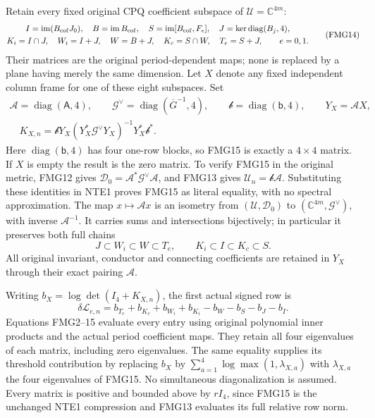 \documentclass[11pt,a4paper]{article}
\begin{document}
Retain every fixed original CPQ coefficient subspace of
$\mathcal U=\mathbb C^{4m}$:
\[
\begin{gathered}
 I=\operatorname{im}(B_{\rm cof}J_0),\quad
 B=\operatorname{im}B_{\rm cof},\quad
 S=\operatorname{im}[B_{\rm cof},F_e],\quad
 J=\ker\operatorname{diag}(B_j,4),\\
 K_i=I\cap J,\quad W_i=I+J,\quad W=B+J,\quad
 K_c=S\cap W,\quad T_e=S+J,\qquad e=0,1.
\end{gathered}                                                   \tag{FMG14}
\]
Their matrices are the original period-dependent maps; none is
replaced by a plane having merely the same dimension. Let $X$ denote
any fixed independent column frame for one of these eight subspaces.
Set
\[
\begin{gathered}
 \mathcal A=\operatorname{diag}(\mathsf A,4),\qquad
 \mathcal G^\vee=\operatorname{diag}(\overline G^{-1},4),\qquad
 \mathcal b=\operatorname{diag}(\mathsf b,4),\qquad Y_X=\mathcal A X,\\
 \boxed{\quad
 K_{X,n}=\mathcal bY_X(Y_X^*\mathcal G^\vee Y_X)^{-1}
                           Y_X^*\mathcal b^* .\quad}
\end{gathered}                                                   \tag{FMG15}
\]
Here $\operatorname{diag}(\mathsf b,4)$ has four one-row blocks,
so FMG15 is exactly a $4\times4$ matrix. If $X$ is empty the result
is the zero matrix. To verify FMG15 in the original metric, FMG12
gives $\mathcal D_0=\mathcal A^*\mathcal G^\vee\mathcal A$,
and FMG13 gives $\mathcal U_n=\mathcal b\mathcal A$. Substituting
these identities in NTE1 proves FMG15 as literal equality, with
no spectral approximation. The map $x\mapsto\mathcal A x$ is
an isometry from $(\mathcal U,\mathcal D_0)$ to
$(\mathbb C^{4m},\mathcal G^\vee)$, with inverse
$\mathcal A^{-1}$. It carries sums and intersections bijectively;
in particular it preserves both full chains
\[
 J\subset W_i\subset W\subset T_e,
       \qquad K_i\subset I\subset K_c\subset S.             \tag{FMG16}
\]
All original invariant, conductor and connecting coefficients are
retained in $Y_X$ through their exact pairing $\mathcal A$.

Writing $b_X=\log\det(I_4+K_{X,n})$, the first actual signed row is
\[
 \delta\mathcal L_{e,n}=
 b_{T_e}+b_{K_c}+b_{W_i}+b_{K_i}-b_W-b_S-b_J-b_I .         \tag{FMG17}
\]
Equations FMG2--15 evaluate every entry using original polynomial
inner products and the actual period coefficient maps. They retain
all four eigenvalues of each matrix, including zero eigenvalues.
The same equality supplies its threshold contribution by replacing
$b_X$ by $\sum_{a=1}^4\log\max(1,\lambda_{X,a})$ with
$\lambda_{X,a}$ the four eigenvalues of FMG15. No simultaneous
diagonalization is assumed. Every matrix is positive and bounded
above by $rI_4$, since FMG15 is the unchanged NTE1 compression
and FMG13 evaluates its full relative row norm.
\end{document}

